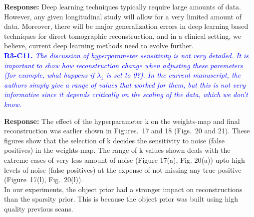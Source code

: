 \documentclass{article}
\begin{document}
\textbf{Response:} Deep learning techniques typically require large amounts of data. However, any given longitudinal study will allow for a very limited amount of data. Moreover, there will be major generalization errors in deep learning based techniques for direct tomographic reconstruction, and in a clinical setting, we believe, current deep learning methods need to evolve further.\\

\textcolor{blue}{\textbf{R3-C11.}\textit{ The discussion of hyperparameter sensitivity is not very detailed. It is important to show how reconstruction change when adjusting these paremeters (for example, what happens if $\lambda_1$ is set to 0?). In the current manuscript, the authors simply give a range of values that worked for them, but this is not very informative since it depends critically on the scaling of the data, which we don't know.}}

\textbf{Response:} The effect of the hyperparameter k on the weights-map and final reconstruction was earlier shown in Figures.~17 and 18 (Figs.~20 and 21). These figures show that the selection of k decides the sensitivity to noise (false positives) in the weights-map. The range of k values shown deals with the extreme cases of very less amount of noise (Figure 17(a), Fig. 20(a)) upto high levels of noise (false positives) at the expense of not missing any true positive (Figure~17(l), Fig.~20(l)). \\

In our experiments, the object prior had a stronger impact on reconstructions than the sparsity prior. This is because the object prior was built using high quality previous scans. 
\end{document}
